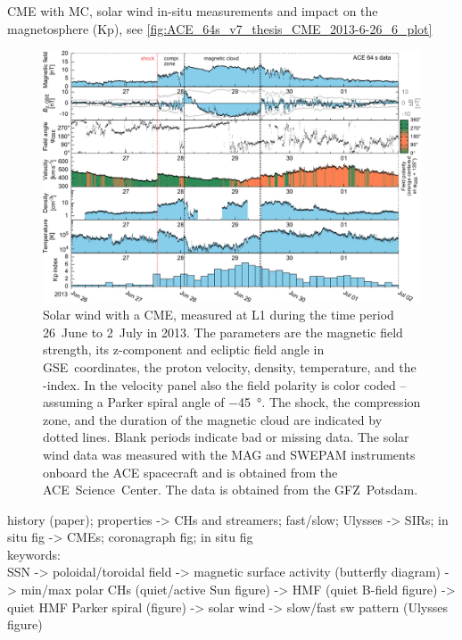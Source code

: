 CME with MC, solar wind in-situ measurements and impact on the magnetosphere (Kp), see \autoref{fig:ACE_64s_v7_thesis_CME_2013-6-26_6_plot}\\
\begin{figure}[htb]
	\centering
	\includegraphics[width=\textwidth]{figures_of_mine/gnuplots/ACE_64s_v7_thesis_CME_2013-6-26_6_plot.pdf}
	\caption{Solar wind with a CME, measured at L1 during the time period 26~June to 2~July in 2013. The parameters are the magnetic field strength, its z-component and ecliptic field angle in GSE~coordinates, the proton velocity, density, temperature, and the \Kp-index. In the velocity panel also the field polarity is color coded -- assuming a Parker spiral angle of \SI{-45}{\degree}. The shock, the compression zone, and the duration of the magnetic cloud are indicated by dotted lines. Blank periods indicate bad or missing data. The solar wind data was measured with the MAG and SWEPAM instruments onboard the ACE spacecraft and is obtained from the ACE~Science~Center. The \Kp{} data is obtained from the GFZ~Potsdam.}
	\label{fig:ACE_64s_v7_thesis_CME_2013-6-26_6_plot}
\end{figure}



history (paper); properties -> CHs and streamers; fast/slow; Ulysses -> SIRs; in situ fig -> CMEs; coronagraph fig; in situ fig\\

keywords:\\
SSN -> poloidal/toroidal field -> magnetic surface activity (butterfly diagram) -> min/max polar CHs (quiet/active Sun figure) -> HMF (quiet B-field figure) -> quiet HMF Parker spiral (figure) -> solar wind -> slow/fast sw pattern (Ulysses figure)\\



